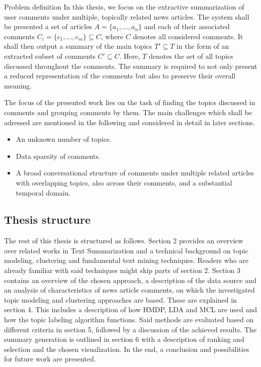 \begin{definition}{Problem definition}
In this thesis, we focus on the extractive summarization of user comments under multiple, topically related news articles. The system shall be presented a set of articles $A=\{a_1,...,a_n\}$ and each of their associated comments $C_i = \{c_1,...,c_m\} \subseteq C$, where $C$ denotes all considered comments. It shall then output a summary of the main topics $T\prime \subseteq T$ in the form of an extracted subset of comments $C\prime \subseteq C$. Here, $T$ denotes the set of all topics discussed throughout the comments. The summary is required to not only present a reduced representation of the comments but also to preserve their overall meaning. \par
The focus of the presented work lies on the task of finding the topics discussed in comments and grouping comments by them. The main challenges which shall be adressed are mentioned in the following and considered in detail in later sections.
\begin{itemize}
\item An unknown number of topics.
\item Data sparsity of comments.
\item A broad conversational structure of comments under multiple related articles with overlapping topics, also across their comments, and a substantial temporal domain.
\end{itemize}
\end{definition}

\subsection{Thesis structure}
The rest of this thesis is structured as follows. Section 2 provides an overview over related works in Text Summarization and a technical background on topic modeling, clustering and fundamental text mining techniques. Readers who are already familiar with said techniques might skip parts of section 2.
Section 3 contains an overview of the chosen approach, a description of the data source and an analysis of characteristics of news article comments, on which the investigated topic modeling and clustering approaches are based. These are explained in section 4. This includes a description of how HMDP, LDA and MCL are used and how the topic labeling algorithm functions. Said methods are evaluated based on different criteria in section 5, followed by a discussion of the achieved results. The summary generation is outlined in section 6 with a description of ranking and selection and the chosen visualization.
In the end, a conclusion and possibilities for future work are presented.